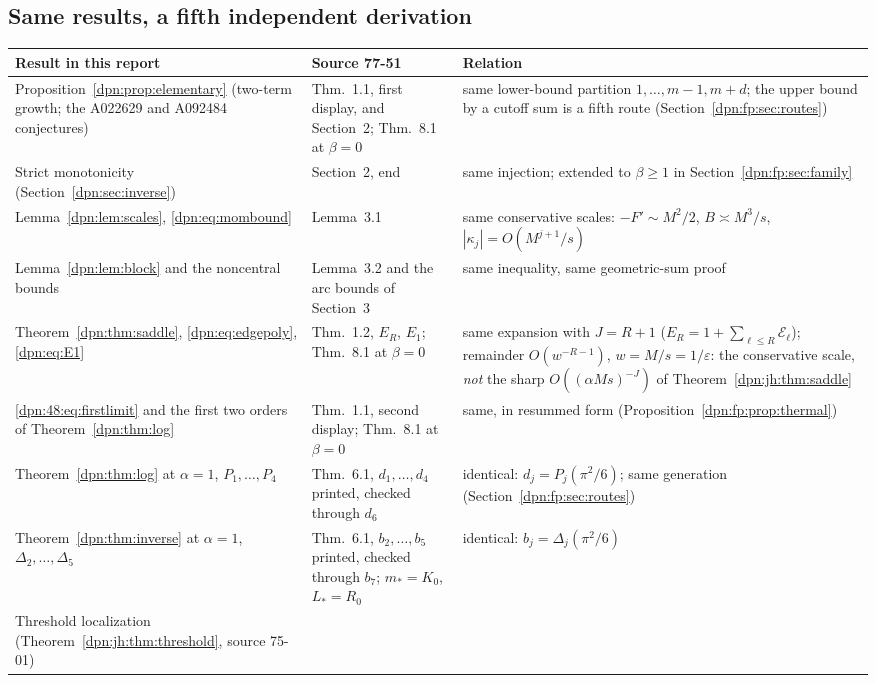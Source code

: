 \documentclass[11pt]{article}
\numberwithin{equation}{section}
\theoremstyle{definition}\newtheorem{definition}[theorem]{Definition}
\theoremstyle{remark}\newtheorem{remark}[theorem]{Remark}
\newcommand{\eps}{\varepsilon}
\begin{document}
\subsection{Same results, a fifth independent derivation}\label{dpn:fp:sec:dup}
\begin{table}[!htbp]
\centering\small
\begin{tabular}{>{\raggedright\arraybackslash}p{4.2cm}>{\raggedright\arraybackslash}p{4.0cm}>{\raggedright\arraybackslash}p{5.6cm}}
\toprule
Result in this report & Source 77-51 & Relation\\
\midrule
Proposition~\ref{dpn:prop:elementary} (two-term growth; the A022629 and A092484
conjectures) & Thm.~1.1, first display, and Section~2; Thm.~8.1 at $\beta=0$ &
 same lower-bound partition $1,\dots,m-1,m+d$; the upper bound by a cutoff sum
 is a fifth route (Section~\ref{dpn:fp:sec:routes})\\
Strict monotonicity (Section~\ref{dpn:sec:inverse}) & Section~2, end &
 same injection; extended to $\beta\ge1$ in Section~\ref{dpn:fp:sec:family}\\
Lemma~\ref{dpn:lem:scales}, \eqref{dpn:eq:mombound} & Lemma~3.1 &
 same conservative scales: $-F'\sim M^2/2$, $B\asymp M^3/s$,
 $|\kappa_j|=O(M^{j+1}/s)$\\
Lemma~\ref{dpn:lem:block} and the noncentral bounds & Lemma~3.2 and the arc
 bounds of Section~3 & same inequality, same geometric-sum proof\\
Theorem~\ref{dpn:thm:saddle}, \eqref{dpn:eq:edgepoly}, \eqref{dpn:eq:E1} &
 Thm.~1.2, $E_R$, $E_1$; Thm.~8.1 at $\beta=0$ & same expansion with $J=R+1$
 ($E_R=1+\sum_{\ell\le R}\mathcal E_\ell$); remainder $O(w^{-R-1})$,
 $w=M/s=1/\eps$: the conservative scale, \emph{not} the sharp
 $O((\alpha Ms)^{-J})$ of Theorem~\ref{dpn:jh:thm:saddle}\\
\eqref{dpn:48:eq:firstlimit} and the first two orders of
 Theorem~\ref{dpn:thm:log} & Thm.~1.1, second display; Thm.~8.1 at $\beta=0$ &
 same, in resummed form (Proposition~\ref{dpn:fp:prop:thermal})\\
Theorem~\ref{dpn:thm:log} at $\alpha=1$, $P_1,\dots,P_4$ & Thm.~6.1,
 $d_1,\dots,d_4$ printed, checked through $d_6$ & identical:
 $d_j=P_j(\pi^2/6)$; same generation (Section~\ref{dpn:fp:sec:routes})\\
Theorem~\ref{dpn:thm:inverse} at $\alpha=1$, $\Delta_2,\dots,\Delta_5$ &
 Thm.~6.1, $b_2,\dots,b_5$ printed, checked through $b_7$; $m_*=K_0$,
 $L_*=R_0$ & identical: $b_j=\Delta_j(\pi^2/6)$\\
Threshold localization (Theorem~\ref{dpn:jh:thm:threshold}, source 75-01) &

\end{tabular}
\end{table}
\end{document}
